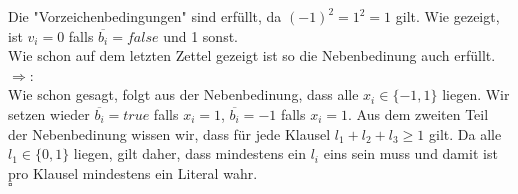 \documentclass[11pt,a4paper,ngerman]{article}
\begin{document}
Die "Vorzeichenbedingungen" sind erfüllt, da $(-1)^2 = 1^2 = 1$ gilt. Wie gezeigt, ist $v_i = 0$ falls $\overline{b_i} = false$ und 1 sonst.\\
Wie schon auf dem letzten Zettel gezeigt ist so die Nebenbedinung auch erfüllt.\\

$\Rightarrow$:\\
Wie schon gesagt, folgt aus der Nebenbedinung, dass alle $x_i \in \{ -1, 1\}$ liegen. Wir setzen wieder $\overline{b_i} = true$ falls
$x_i = 1$, $\overline{b_i} = -1$ falls $x_i = 1$. Aus dem zweiten Teil der Nebenbedinung wissen wir, dass für jede Klausel $l_1 + l_2 + l_3 \geq 1$ gilt.
Da alle $l_1 \in \{ 0 , 1 \}$ liegen, gilt daher, dass mindestens ein $l_i$ eins sein muss und damit ist pro Klausel mindestens ein Literal wahr.\\

\mbox{} \hfill $\square$

\end{document}
